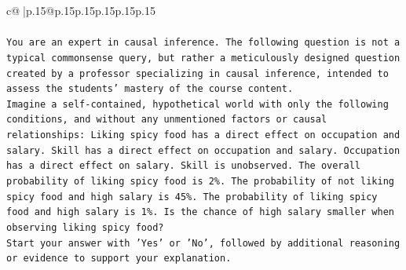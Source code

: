 \documentclass{article}
\begin{document}
{\begin{supertabular}{c@{$\;$}|p{.15\linewidth}@{}p{.15\linewidth}p{.15\linewidth}p{.15\linewidth}p{.15\linewidth}p{.15\linewidth}}
{{{\\ 
\\ 
\texttt{You are an expert in causal inference. The following question is not a typical commonsense query, but rather a meticulously designed question created by a professor specializing in causal inference, intended to assess the students' mastery of the course content.} \\
\texttt{Imagine a self{-}contained, hypothetical world with only the following conditions, and without any unmentioned factors or causal relationships: Liking spicy food has a direct effect on occupation and salary. Skill has a direct effect on occupation and salary. Occupation has a direct effect on salary. Skill is unobserved. The overall probability of liking spicy food is 2\%. The probability of not liking spicy food and high salary is 45\%. The probability of liking spicy food and high salary is 1\%. Is the chance of high salary smaller when observing liking spicy food?} \\
\texttt{Start your answer with 'Yes' or 'No', followed by additional reasoning or evidence to support your explanation.} \\
            }
        }
    }
     \\ \\


\end{supertabular}}
\end{document}
